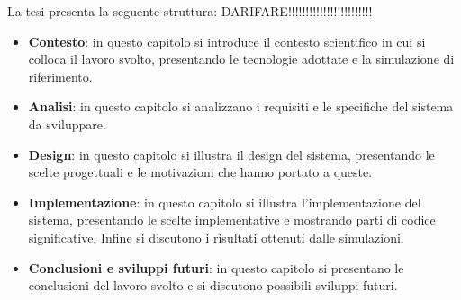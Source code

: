 La tesi presenta la seguente struttura: DARIFARE!!!!!!!!!!!!!!!!!!!!!!!!
\begin{itemize}
    \item \textbf{Contesto}: in questo capitolo si introduce il contesto scientifico in cui si colloca il lavoro svolto,
    presentando le tecnologie adottate e la simulazione di riferimento.
    \item \textbf{Analisi}: in questo capitolo si analizzano i requisiti e le specifiche del sistema da sviluppare.
    \item \textbf{Design}: in questo capitolo si illustra il design del sistema, presentando le scelte progettuali e le motivazioni che hanno portato a queste.
    \item \textbf{Implementazione}: in questo capitolo si illustra l'implementazione del sistema, presentando le scelte implementative e mostrando parti di codice significative. Infine si discutono i risultati ottenuti dalle simulazioni.
    \item \textbf{Conclusioni e sviluppi futuri}: in questo capitolo si presentano le conclusioni del lavoro svolto e si discutono possibili sviluppi futuri.
\end{itemize}